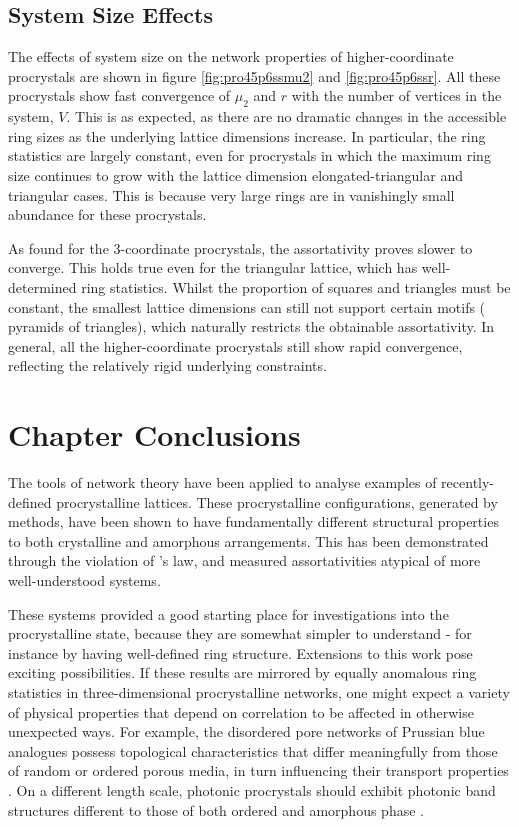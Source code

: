 \subsection{System Size Effects}

The effects of system size on the network properties of higher\--coordinate procrystals are shown in figure \ref{fig:pro45p6ssmu2} and \ref{fig:pro45p6ssr}.
All these procrystals show fast convergence of $\mu_2$ and $r$ with the number of vertices in the system, $V$.
This is as expected, as there are no dramatic changes in the accessible ring sizes as the underlying lattice dimensions increase.
In particular, the ring statistics are largely constant, even for procrystals in which the maximum ring size continues to grow with the lattice dimension \ie{} elongated\--triangular and triangular cases.
This is because very large rings are in vanishingly small abundance for these  procrystals.

As found for the 3\--coordinate procrystals, the assortativity proves slower to converge. 
This holds true even for the triangular lattice, which has well\--determined ring statistics.
Whilst the proportion of squares and triangles must be constant, the smallest lattice dimensions can still not support certain motifs (\eg{} pyramids of triangles), which naturally restricts the obtainable assortativity.
In general, all the higher\--coordinate procrystals still show rapid convergence, reflecting the relatively rigid underlying constraints.

\section{Chapter Conclusions}

The tools of network theory have been applied to analyse \td{} examples of recently\--defined procrystalline lattices.
These procrystalline configurations, generated by \mc{} methods, have been shown to have fundamentally different structural properties to both crystalline and amorphous arrangements.
This has been demonstrated through the violation of \lm's law, and measured assortativities atypical of more well\--understood systems.

These \td{} systems provided a good starting place for investigations into the procrystalline state, because they are somewhat simpler to understand \-- for instance by having well\--defined ring structure.
Extensions to this work pose exciting possibilities.
If these results are mirrored by equally anomalous ring statistics in three\--dimensional procrystalline networks, one might expect a variety of physical properties that depend on correlation to be affected in otherwise unexpected ways. 
For example, the disordered pore networks of Prussian blue analogues possess topological characteristics that differ meaningfully from those of random or ordered porous media, in turn influencing their transport properties \cite{Simonov2020}.
On a different length scale, photonic procrystals should exhibit photonic band structures different to those of both ordered and amorphous phase \cite{Florescu2009,Sellers2017}.
